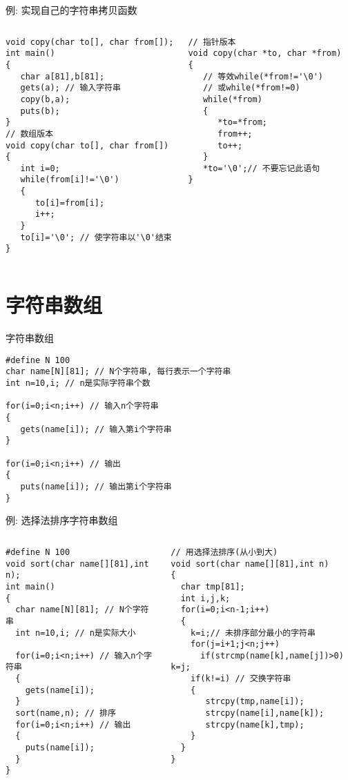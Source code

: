 \begin{frame}{例: 实现自己的字符串拷贝函数}
\vspace{-0.5cm}
\begin{columns}[T]
\begin{lstlisting}
void copy(char to[], char from[]);
int main()
{
   char a[81],b[81];
   gets(a); // 输入字符串
   copy(b,a);
   puts(b);
}
// 数组版本
void copy(char to[], char from[])
{
   int i=0;
   while(from[i]!='\0')
   {
      to[i]=from[i];
      i++;
   }
   to[i]='\0'; // 使字符串以'\0'结束
}
\end{lstlisting}
\begin{lstlisting}[frame=leftline]
// 指针版本
void copy(char *to, char *from)
{
   // 等效while(*from!='\0')
   // 或while(*from!=0)
   while(*from) 
   {
      *to=*from;
      from++;
      to++;
   }
   *to='\0';// 不要忘记此语句
}
\end{lstlisting}
\end{columns}
\medskip
\end{frame}

\section{字符串数组}

\begin{frame}{字符串数组}
\begin{lstlisting}
#define N 100
char name[N][81]; // N个字符串, 每行表示一个字符串
int n=10,i; // n是实际字符串个数

for(i=0;i<n;i++) // 输入n个字符串
{
   gets(name[i]); // 输入第i个字符串
}

for(i=0;i<n;i++) // 输出
{
   puts(name[i]); // 输出第i个字符串
}
\end{lstlisting}
\end{frame}

\begin{frame}{例: 选择法排序字符串数组}
\vspace{-0.5cm}
\begin{columns}[T]
\begin{lstlisting}
#define N 100
void sort(char name[][81],int n);
int main()
{
  char name[N][81]; // N个字符串
  int n=10,i; // n是实际大小

  for(i=0;i<n;i++) // 输入n个字符串
  {
    gets(name[i]); 
  }
  sort(name,n); // 排序
  for(i=0;i<n;i++) // 输出
  {
    puts(name[i]); 
  }
}
\end{lstlisting}
\begin{lstlisting}[frame=leftline]
// 用选择法排序(从小到大)
void sort(char name[][81],int n)
{
  char tmp[81];
  int i,j,k;
  for(i=0;i<n-1;i++)
  {
    k=i;// 未排序部分最小的字符串
    for(j=i+1;j<n;j++)
      if(strcmp(name[k],name[j])>0) k=j;
    if(k!=i) // 交换字符串
    {
       strcpy(tmp,name[i]); 
       strcpy(name[i],name[k]); 
       strcpy(name[k],tmp);
    }
  }
}
\end{lstlisting}
\end{columns}
~\\
\end{frame}

